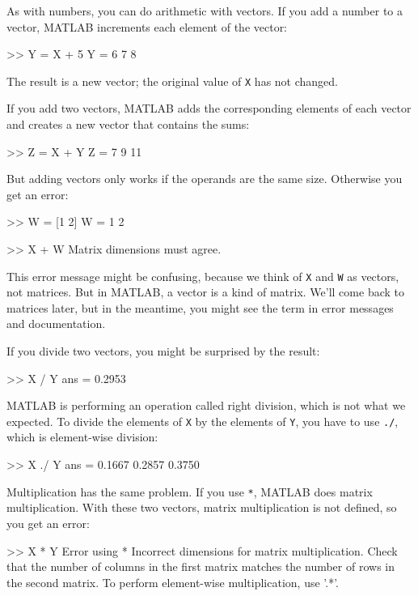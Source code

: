 As with numbers, you can do arithmetic with vectors.  If you add a number
to a vector, MATLAB increments each element of the vector:

\begin{code}
>> Y = X + 5
Y = 6     7     8
\end{code}

The result is a new vector; the original value of \lstinline{X} has not
changed.

If you add two vectors, MATLAB adds the corresponding elements of each
vector and creates a new vector that contains the sums:

\begin{code}
>> Z = X + Y
Z = 7     9    11
\end{code}

But adding vectors only works if the operands are the same size.
Otherwise you get an error:

\begin{code}
>> W = [1 2]
W = 1     2

>> X + W
Matrix dimensions must agree.
\end{code}

This error message might be confusing, because we think of \lstinline{X} and \lstinline{W} as vectors, not matrices.
But in MATLAB, a vector is a kind of matrix.
We'll come back to matrices later, but in the meantime, you might see the term in error messages and documentation.


If you divide two vectors, you might be surprised by the result:

\begin{code}
>> X / Y
ans = 0.2953
\end{code}

MATLAB is performing an operation called right division, which is not what we expected.
To divide the elements of \lstinline{X} by the elements of \lstinline{Y}, you have to use \lstinline{./}, which is element-wise division:

\begin{code}
>> X ./ Y
ans = 0.1667    0.2857    0.3750
\end{code}

Multiplication has the same problem.  If you use \lstinline{*}, MATLAB does matrix multiplication.  With these two vectors, matrix multiplication is not defined, so you get an error:

\begin{code}
>> X * Y
Error using  *
Incorrect dimensions for matrix multiplication.
Check that the number of columns in the first matrix
matches the number of rows in the second matrix.
To perform element-wise multiplication, use '.*'.
\end{code}

